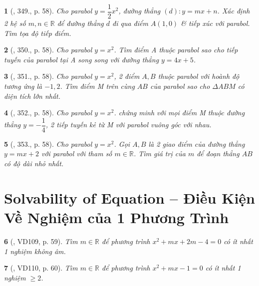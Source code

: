 \documentclass{article}
\newtheorem{baitoan}{}
\begin{document}
\begin{baitoan}[\cite{Binh_Toan_9_tap_2}, 349., p. 58]
	Cho parabol $y = \dfrac{1}{2}x^2$, đường thẳng $(d):y = mx + n$. Xác định 2 hệ số $m,n\in\mathbb{R}$ để đường thẳng $d$ đi qua điểm $A(1,0)$ \& tiếp xúc với parabol. Tìm tọa độ tiếp điểm.
\end{baitoan}

\begin{baitoan}[\cite{Binh_Toan_9_tap_2}, 350., p. 58]
	Cho parabol $y = x^2$. Tìm điểm A thuộc parabol sao cho tiếp tuyến của parabol tại A song song với đường thẳng $y = 4x + 5$.
\end{baitoan}

\begin{baitoan}[\cite{Binh_Toan_9_tap_2}, 351., p. 58]
	Cho parabol $y = x^2$, 2 điểm $A,B$ thuộc parabol với hoành độ tương ứng là $-1,2$. Tìm điểm M trên cùng $AB$ của parabol sao cho $\Delta ABM$ có diện tích lớn nhất.
\end{baitoan}

\begin{baitoan}[\cite{Binh_Toan_9_tap_2}, 352., p. 58]
	Cho parabol $y = x^2$. chứng minh với mọi điểm M thuộc đường thẳng $y = -\dfrac{1}{4}$, 2 tiếp tuyến kẻ từ M với parabol vuông góc với nhau.
\end{baitoan}

\begin{baitoan}[\cite{Binh_Toan_9_tap_2}, 353., p. 58]
	Cho parabol $y = x^2$. Gọi $A,B$ là 2 giao điểm của đường thẳng $y = mx + 2$ với parabol với tham số $m\in\mathbb{R}$. Tìm giá trị của $m$ để đoạn thẳng $AB$ có độ dài nhỏ nhất.
\end{baitoan}


\section{Solvability of Equation -- Điều Kiện Về Nghiệm của 1 Phương Trình}

\begin{baitoan}[\cite{Binh_Toan_9_tap_2}, VD109, p. 59]
	Tìm $m\in\mathbb{R}$ để phương trình $x^2 + mx + 2m - 4 = 0$ có ít nhất 1 nghiệm không âm.
\end{baitoan}

\begin{baitoan}[\cite{Binh_Toan_9_tap_2}, VD110, p. 60]
	Tìm $m\in\mathbb{R}$ để phương trình $x^2 + mx - 1 = 0$ có ít nhất 1 nghiệm $\ge2$.
\end{baitoan}
\end{document}
